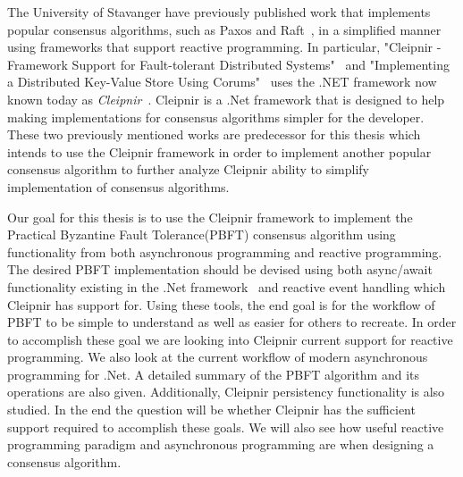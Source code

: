 The University of Stavanger have previously published work that implements popular consensus algorithms, such as Paxos and Raft~\cite{WEB:ConsesAlgo}, in a simplified manner using frameworks that support reactive programming. In particular, "Cleipnir - Framework Support for Fault-tolerant Distributed Systems"~\cite{PAPER:PaxosCleipnir} and "Implementing a Distributed Key-Value Store Using Corums"~\cite{PAPER:EivindPaper} uses the .NET framework now known today as \textit{Cleipnir}~\cite{DOC:Cleipnir}. 
Cleipnir is a .Net framework that is designed to help making implementations for consensus algorithms simpler for the developer.
These two previously mentioned works are predecessor for this thesis which intends to use the Cleipnir framework in order to implement another popular consensus algorithm to further analyze Cleipnir ability to simplify implementation of consensus algorithms.

Our goal for this thesis is to use the Cleipnir framework to implement the Practical Byzantine Fault Tolerance(PBFT) consensus algorithm using functionality from both asynchronous programming and reactive programming. The desired PBFT implementation should be devised using both async/await functionality existing in the .Net framework~\cite{DOC:AsyncAwait} and reactive event handling which Cleipnir has support for. Using these tools, the end goal is for the workflow of PBFT to be simple to understand as well as easier for others to recreate. In order to accomplish these goal we are looking into Cleipnir current support for reactive programming. We also look at the current workflow of modern asynchronous programming for .Net. A detailed summary of the PBFT algorithm and its operations are also given. Additionally, Cleipnir persistency functionality is also studied.
In the end the question will be whether Cleipnir has the sufficient support required to accomplish these goals. We will also see how useful reactive programming paradigm and asynchronous programming are when designing a consensus algorithm. 


